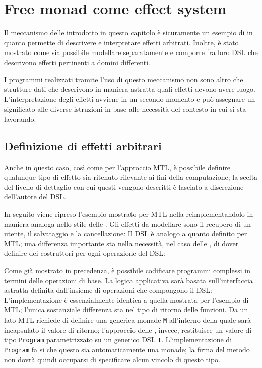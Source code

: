 \section{Free monad come effect system}
Il meccanismo delle  introdotto in questo capitolo è sicuramente un esempio di  in quanto permette di descrivere e interpretare effetti arbitrati. Inoltre, è stato mostrato come sia possibile modellare separatamente e comporre fra loro DSL che descrivono effetti pertinenti a domini differenti.

I programmi realizzati tramite l'uso di questo meccanismo non sono altro che strutture dati che descrivono in maniera astratta quali effetti devono avere luogo. L'interpretazione degli effetti avviene in un secondo momento e può assegnare un significato alle diverse istruzioni in base alle necessità del contesto in cui si sta lavorando.

\subsection{Definizione di effetti arbitrari}
\label{sec:free-effetti-arbitrari}
Anche in questo caso, così come per l'approccio \ac{MTL}, è possibile definire qualunque tipo di effetto sia ritenuto rilevante ai fini della computazione; la scelta del livello di dettaglio con cui questi vengono descritti è lasciato a discrezione dell'autore del DSL.

In seguito viene ripreso l'esempio mostrato per \ac{MTL} nella  reimplementandolo in maniera analoga nello stile delle . Gli effetti da modellare sono il recupero di un utente, il salvataggio e la cancellazione:
Il DSL è analogo a quanto definito per \ac{MTL}; una differenza importante sta nella necessità, nel caso delle , di dover definire dei costruttori per ogni operazione del DSL:

Come già mostrato in precedenza, è possibile codificare programmi complessi in termini delle operazioni di base. La logica applicativa sarà basata sull'interfaccia astratta definita dall'insieme di operazioni che compongono il DSL:
L'implementazione è essenzialmente identica a quella mostrata per l'esempio di \ac{MTL}; l'unica sostanziale differenza sta nel tipo di ritorno delle funzioni. Da un lato \ac{MTL} richiede di definire una generica monade \lstinline{M} all'interno della quale sarà incapsulato il valore di ritorno; l'approccio delle , invece, restituisce un valore di tipo \lstinline{Program} parametrizzato su un generico DSL \lstinline{I}.
L'implementazione di \lstinline{Program} fa si che questo sia automaticamente una monade; la firma del metodo non dovrà quindi occuparsi di specificare alcun vincolo di questo tipo.

